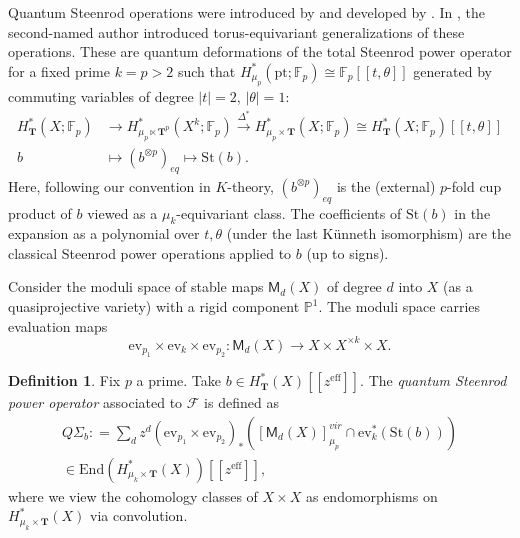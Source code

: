 \documentclass[reqno]{amsart}
\numberwithin{equation}{section}
\numberwithin{equation}{section}
\numberwithin{equation}{section}
\theoremstyle{definition}
\newtheorem{defn}[thm]{Definition}
\theoremstyle{remark}
\theoremstyle{remark}
\begin{document}
Quantum Steenrod operations were introduced by \cite{Fuk97} and developed by \cite{Wil-sur, seidel-wilkins}. In \cite{Lee23a, Lee23b}, the second-named author introduced torus-equivariant generalizations of these operations. These are quantum deformations of the total Steenrod power operator for a fixed prime $k=p>2$ such that $H^*_{\mu_p}(\mathrm{pt};\mathbb{F}_p) \cong \mathbb{F}_p [\![ t, \theta]\!]$ generated by commuting variables of degree $|t|=2$, $|\theta|=1$:
\begin{align}
H^*_{\mathbf{T}}(X;\mathbb{F}_p) &\to H^*_{\mu_p \ltimes \mathbf{T}^p}(X^k;\mathbb{F}_p) \overset{\Delta^*}{\to} H^*_{\mu_p \times \mathbf{T}} (X;\mathbb{F}_p) \cong H^*_{\mathbf{T}}(X;\mathbb{F}_p) [\![ t, \theta]\!] \\
b & \mapsto  (b^{\otimes p})_{eq} \mapsto \mathrm{St}(b).
\end{align}
Here, following our convention in $K$-theory, $(b^{\otimes p})_{eq}$ is the (external) $p$-fold cup product of $b$ viewed as a $\mu_k$-equivariant class. The coefficients of $\mathrm{St}(b)$ in the expansion as a polynomial over $t, \theta$ (under the last K\"unneth isomorphism) are the classical Steenrod power operations applied to $b$ (up to signs). 

Consider the moduli space of stable maps $\mathsf{M}_d(X)$ of degree $d$ into $X$ (as a quasiprojective variety) with a rigid component $\mathbb{P}^1$. The moduli space carries evaluation maps
\begin{equation}
    \mathrm{ev}_{p_1} \times \mathrm{ev}_k \times \mathrm{ev}_{p_2} : \mathsf{M}_d(X) \to X \times X^{\times k} \times X.
\end{equation}


\begin{defn}
    Fix $p$ a prime. Take $b \in H^*_{\mathbf{T}}(X)[\![ z^{\mathrm{eff}} ]\!]$. The \emph{quantum Steenrod power operator} associated to $\mathcal{F}$ is defined as
    \begin{equation}\label{eqn:power-H}
    \begin{aligned}
        Q\Sigma_b : = \sum_{d} z^d (\mathrm{ev}_{p_1} \times \mathrm{ev}_{p_2})_* \left( [\mathsf{M}_d(X)]^{vir}_{\mu_p} \cap \mathrm{ev}_k^* (\mathrm{St}(b)) \right) \\ \in \mathrm{End}(H^*_{\mu_k \times \mathbf{T}}(X))[\![ z^{\mathrm{eff}} ]\!],
    \end{aligned}
    \end{equation}
    where we view the cohomology classes of $X \times X$ as endomorphisms on $H^*_{\mu_k \times \mathbf{T}}(X)$ via convolution.
\end{defn}
\end{document}
